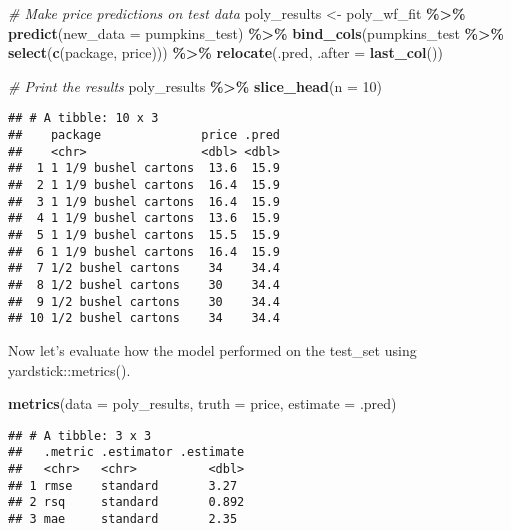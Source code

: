 \documentclass[
]{article}
\newenvironment{Shaded}{\begin{snugshade}}{\end{snugshade}}
\newcommand{\AttributeTok}[1]{\textcolor[rgb]{0.13,0.29,0.53}{#1}}
\newcommand{\CommentTok}[1]{\textcolor[rgb]{0.56,0.35,0.01}{\textit{#1}}}
\newcommand{\DecValTok}[1]{\textcolor[rgb]{0.00,0.00,0.81}{#1}}
\newcommand{\FunctionTok}[1]{\textcolor[rgb]{0.13,0.29,0.53}{\textbf{#1}}}
\newcommand{\NormalTok}[1]{#1}
\newcommand{\OtherTok}[1]{\textcolor[rgb]{0.56,0.35,0.01}{#1}}
\newcommand{\SpecialCharTok}[1]{\textcolor[rgb]{0.81,0.36,0.00}{\textbf{#1}}}
\begin{document}
\begin{Shaded}
\begin{Highlighting}[]
\CommentTok{\# Make price predictions on test data}
\NormalTok{poly\_results }\OtherTok{\textless{}{-}}\NormalTok{ poly\_wf\_fit }\SpecialCharTok{\%\textgreater{}\%} \FunctionTok{predict}\NormalTok{(}\AttributeTok{new\_data =}\NormalTok{ pumpkins\_test) }\SpecialCharTok{\%\textgreater{}\%} 
  \FunctionTok{bind\_cols}\NormalTok{(pumpkins\_test }\SpecialCharTok{\%\textgreater{}\%} \FunctionTok{select}\NormalTok{(}\FunctionTok{c}\NormalTok{(package, price))) }\SpecialCharTok{\%\textgreater{}\%} 
  \FunctionTok{relocate}\NormalTok{(.pred, }\AttributeTok{.after =} \FunctionTok{last\_col}\NormalTok{())}

\CommentTok{\# Print the results}
\NormalTok{poly\_results }\SpecialCharTok{\%\textgreater{}\%} 
  \FunctionTok{slice\_head}\NormalTok{(}\AttributeTok{n =} \DecValTok{10}\NormalTok{)}
\end{Highlighting}
\end{Shaded}

\begin{verbatim}
## # A tibble: 10 x 3
##    package              price .pred
##    <chr>                <dbl> <dbl>
##  1 1 1/9 bushel cartons  13.6  15.9
##  2 1 1/9 bushel cartons  16.4  15.9
##  3 1 1/9 bushel cartons  16.4  15.9
##  4 1 1/9 bushel cartons  13.6  15.9
##  5 1 1/9 bushel cartons  15.5  15.9
##  6 1 1/9 bushel cartons  16.4  15.9
##  7 1/2 bushel cartons    34    34.4
##  8 1/2 bushel cartons    30    34.4
##  9 1/2 bushel cartons    30    34.4
## 10 1/2 bushel cartons    34    34.4
\end{verbatim}

Now let's evaluate how the model performed on the test\_set using
yardstick::metrics().

\begin{Shaded}
\begin{Highlighting}[]
\FunctionTok{metrics}\NormalTok{(}\AttributeTok{data =}\NormalTok{ poly\_results, }\AttributeTok{truth =}\NormalTok{ price, }\AttributeTok{estimate =}\NormalTok{ .pred)}
\end{Highlighting}
\end{Shaded}

\begin{verbatim}
## # A tibble: 3 x 3
##   .metric .estimator .estimate
##   <chr>   <chr>          <dbl>
## 1 rmse    standard       3.27 
## 2 rsq     standard       0.892
## 3 mae     standard       2.35
\end{verbatim}
\end{document}
